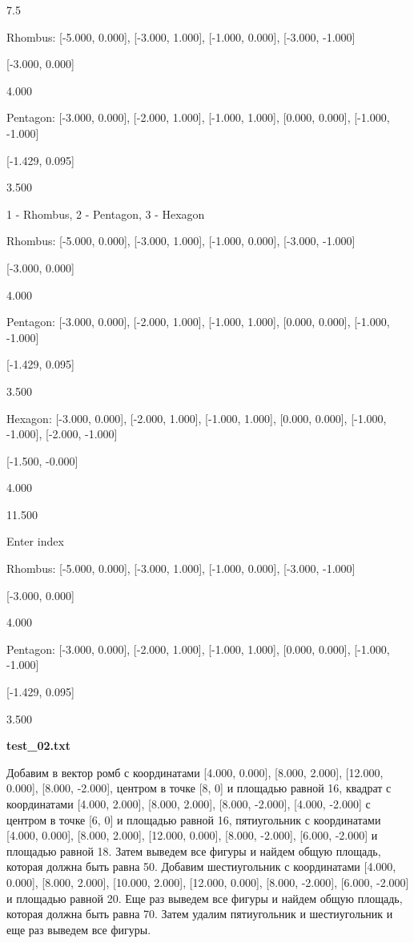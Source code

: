 \documentclass[a4paper, 12pt]{article}
\begin{document}
7.5

Rhombus: [-5.000, 0.000], [-3.000, 1.000], [-1.000, 0.000], [-3.000, -1.000]

[-3.000, 0.000]

4.000

Pentagon: [-3.000, 0.000], [-2.000, 1.000], [-1.000, 1.000], [0.000, 0.000], [-1.000, -1.000]

[-1.429, 0.095]

3.500

1 - Rhombus, 2 - Pentagon, 3 - Hexagon

Rhombus: [-5.000, 0.000], [-3.000, 1.000], [-1.000, 0.000], [-3.000, -1.000]

[-3.000, 0.000]

4.000

Pentagon: [-3.000, 0.000], [-2.000, 1.000], [-1.000, 1.000], [0.000, 0.000], [-1.000, -1.000]

[-1.429, 0.095]

3.500

Hexagon: [-3.000, 0.000], [-2.000, 1.000], [-1.000, 1.000], [0.000, 0.000], [-1.000, -1.000], 
[-2.000, -1.000]

[-1.500, -0.000]

4.000

11.500

Enter index

Rhombus: [-5.000, 0.000], [-3.000, 1.000], [-1.000, 0.000], [-3.000, -1.000]

[-3.000, 0.000]

4.000

Pentagon: [-3.000, 0.000], [-2.000, 1.000], [-1.000, 1.000], [0.000, 0.000], [-1.000, -1.000]

[-1.429, 0.095]

3.500





\vspace{3ex}

\textbf{test\_02.txt} 

Добавим в вектор ромб с координатами [4.000, 0.000], [8.000, 2.000], [12.000, 0.000], [8.000, -2.000], центром в точке [8, 0] и площадью равной 16, квадрат с координатами [4.000, 2.000], [8.000, 2.000], [8.000, -2.000], [4.000, -2.000] с центром в точке [6, 0] и площадью равной 16, пятиугольник с координатами [4.000, 0.000], [8.000, 2.000], [12.000, 0.000], [8.000, -2.000], [6.000, -2.000] и площадью равной 18. Затем выведем все фигуры и найдем общую площадь, которая должна быть равна 50. Добавим шестиугольник с координатами [4.000, 0.000], [8.000, 2.000], [10.000, 2.000], [12.000, 0.000], [8.000, -2.000], [6.000, -2.000] и площадью равной 20. Еще раз выведем все фигуры и найдем общую площадь, которая должна быть равна 70. Затем удалим пятиугольник и шестиугольник и еще раз выведем все фигуры.
\end{document}
